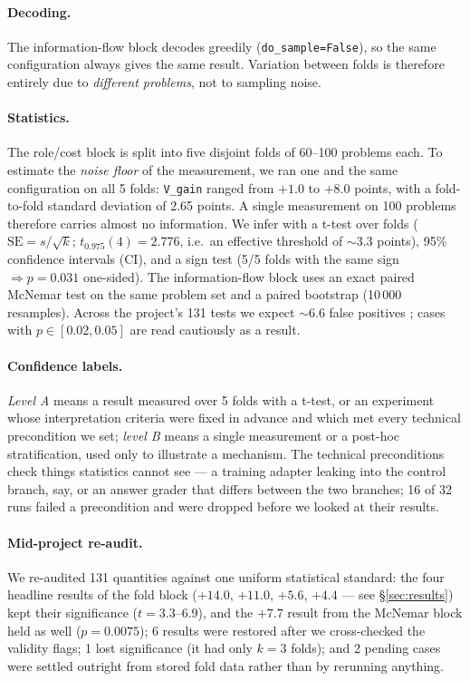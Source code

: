 \documentclass[11pt,a4paper]{article}
\begin{document}
\paragraph{Decoding.} The information-flow block decodes greedily
(\texttt{do\_sample=False}), so the same configuration always gives the same result. Variation
between folds is therefore entirely due to \emph{different problems}, not to sampling noise.

\paragraph{Statistics.} The role/cost block is split into five disjoint folds of 60--100 problems
each. To estimate the \emph{noise floor} of the measurement, we ran one and the same
configuration on all 5 folds: \texttt{V\_gain} ranged from $+1.0$ to $+8.0$ points, with a
fold-to-fold standard deviation of 2.65 points. A single measurement on 100 problems therefore
carries almost no information. We infer with a t-test over folds ($\mathrm{SE}=s/\sqrt{k}$;
$t_{0.975}(4)=2.776$, i.e.\ an effective threshold of $\sim$3.3 points), 95\% confidence
intervals (CI), and a sign test (5/5 folds with the same sign $\Rightarrow p=0.031$ one-sided).
The information-flow block uses an exact paired McNemar test on the same problem set and a paired
bootstrap (10\,000 resamples). Across the project's 131 tests we expect $\sim$6.6 false positives
\cite{bh1995}; cases with $p \in [0.02, 0.05]$ are read cautiously as a result.

\paragraph{Confidence labels.} \emph{Level A} means a result measured over 5 folds with a t-test,
or an experiment whose interpretation criteria were fixed in advance and which met every technical
precondition we set; \emph{level B} means a single measurement or a post-hoc stratification, used
only to illustrate a mechanism. The technical preconditions check things statistics cannot see
--- a training adapter leaking into the control branch, say, or an answer grader that differs
between the two branches; 16 of 32 runs failed a precondition and were dropped before we looked
at their results.

\paragraph{Mid-project re-audit.} We re-audited 131 quantities against one uniform statistical
standard: the four headline results of the fold block ($+14.0$, $+11.0$, $+5.6$, $+4.4$ --- see
\S\ref{sec:results}) kept their significance ($t=3.3$--$6.9$), and the $+7.7$ result from the
McNemar block held as well ($p=0.0075$); 6 results were restored after we cross-checked the
validity flags; 1 lost significance (it had only $k{=}3$ folds); and 2 pending cases were settled
outright from stored fold data rather than by rerunning anything.
\end{document}

